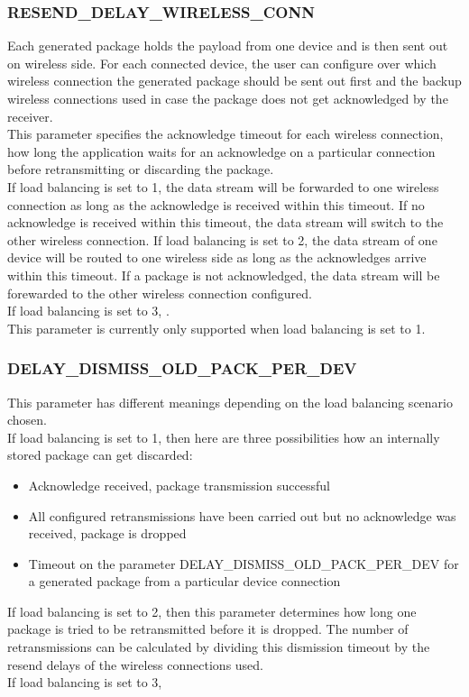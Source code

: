 \subsubsection{RESEND\_DELAY\_WIRELESS\_CONN}
Each generated package holds the payload from one device and is then sent out on wireless side. For each connected device, the user can configure over which wireless connection the generated package should be sent out first and the backup wireless connections used in case the package does not get acknowledged by the receiver.\\
This parameter specifies the acknowledge timeout for each wireless connection, how long the application waits for an acknowledge on a particular connection before retransmitting or discarding the package.\\
If load balancing is set to 1, the data stream will be forwarded to one wireless connection as long as the acknowledge is received within this timeout. If no acknowledge is received within this timeout, the data stream will switch to the other wireless connection.
If load balancing is set to 2, the data stream of one device will be routed to one wireless side as long as the acknowledges arrive within this timeout. If a package is not acknowledged, the data stream will be forewarded to the other wireless connection configured.\\
If load balancing is set to 3, .\\
This parameter is currently only supported when load balancing is set to 1.

%
\subsubsection{DELAY\_DISMISS\_OLD\_PACK\_PER\_DEV}
This parameter has different meanings depending on the load balancing scenario chosen.\\
If load balancing is set to 1, then here are three possibilities how an internally stored package can get discarded:
\begin{itemize}
    \item Acknowledge received, package transmission successful
    \item All configured retransmissions have been carried out but no acknowledge was received, package is dropped
    \item Timeout on the parameter DELAY\_DISMISS\_OLD\_PACK\_PER\_DEV for a generated package from a particular device connection
\end{itemize}
If load balancing is set to 2, then this parameter determines how long one package is tried to be retransmitted before it is dropped. The number of retransmissions can be calculated by dividing this dismission timeout by the resend delays of the wireless connections used.\\
If load balancing is set to 3, 
%
